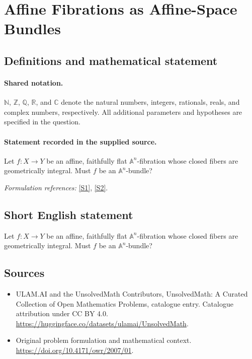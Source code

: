 \documentclass[11pt]{article}
\newcommand{\sref}[2]{\hyperlink{source:#1:#2}{[S#2]}}
\begin{document}
\section{Affine Fibrations as Affine-Space Bundles}\label{statement}

\subsection{Definitions and mathematical statement}

\paragraph{Shared notation.}$\mathbb N$, $\mathbb Z$, $\mathbb Q$, $\mathbb R$, and $\mathbb C$ denote the natural numbers, integers, rationals, reals, and complex numbers, respectively. All additional parameters and hypotheses are specified in the question.


\paragraph{Statement recorded in the supplied source.}
Let $f:X\to Y$ be an affine, faithfully flat $\mathbb{A}^n$-fibration whose closed fibers are geometrically integral. Must $f$ be an $\mathbb{A}^n$-bundle?
\par\smallskip\textit{Formulation references:} \sref{statement}{1}, \sref{statement}{2}.
\subsection{Short English statement}
Let $f:X\to Y$ be an affine, faithfully flat $\mathbb{A}^n$-fibration whose closed fibers are geometrically integral. Must $f$ be an $\mathbb{A}^n$-bundle?
\subsection{Sources}
\begin{itemize}
\item[\hypertarget{source:statement:1}{S1}] ULAM.AI and the UnsolvedMath Contributors, UnsolvedMath: A Curated Collection of Open Mathematics Problems, catalogue entry. Catalogue attribution under CC BY 4.0.
\url{https://huggingface.co/datasets/ulamai/UnsolvedMath}.
\item[\hypertarget{source:statement:2}{S2}] Original problem formulation and mathematical context.
\url{https://doi.org/10.4171/owr/2007/01}.
\end{itemize}
\label{end:statement}
\end{document}
